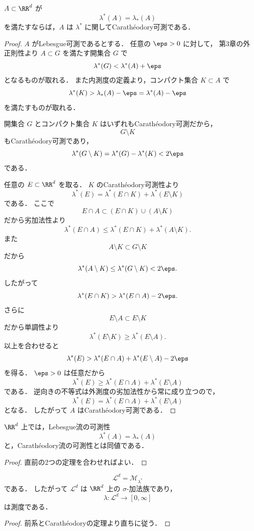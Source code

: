 \begin{theorem}[Lebesgue可測ならCarathéodory可測]
$A \subset \RR^d$ が
\[
\lambda^*(A)=\lambda_*(A)
\]
を満たすならば，$A$ は $\lambda^*$ に関してCarathéodory可測である．
\end{theorem}
\begin{proof}
$A$ がLebesgue可測であるとする．
任意の $\eps>0$ に対して，
第3章の外正則性より $A \subset G$ を満たす開集合 $G$ で
\[
\lambda^*(G)<\lambda^*(A)+\eps
\]
となるものが取れる．
また内測度の定義より，コンパクト集合 $K \subset A$ で
\[
\lambda^*(K)>\lambda_*(A)-\eps=\lambda^*(A)-\eps
\]
を満たすものが取れる．

開集合 $G$ とコンパクト集合 $K$ はいずれもCarathéodory可測だから，
\[
G\setminus K
\]
もCarathéodory可測であり，
\[
\lambda^*(G\setminus K)=\lambda^*(G)-\lambda^*(K)<2\eps
\]
である．

任意の $E \subset \RR^d$ を取る．
$K$ のCarathéodory可測性より
\[
\lambda^*(E)=\lambda^*(E\cap K)+\lambda^*(E\setminus K)
\]
である．
ここで
\[
E\cap A \subset (E\cap K)\cup(A\setminus K)
\]
だから劣加法性より
\[
\lambda^*(E\cap A)\le \lambda^*(E\cap K)+\lambda^*(A\setminus K).
\]
また
\[
A\setminus K \subset G\setminus K
\]
だから
\[
\lambda^*(A\setminus K)\le \lambda^*(G\setminus K)<2\eps.
\]
したがって
\[
\lambda^*(E\cap K)>\lambda^*(E\cap A)-2\eps.
\]
さらに
\[
E\setminus A \subset E\setminus K
\]
だから単調性より
\[
\lambda^*(E\setminus K)\ge \lambda^*(E\setminus A).
\]
以上を合わせると
\[
\lambda^*(E)
>
\lambda^*(E\cap A)+\lambda^*(E\setminus A)-2\eps
\]
を得る．
$\eps>0$ は任意だから
\[
\lambda^*(E)\ge \lambda^*(E\cap A)+\lambda^*(E\setminus A)
\]
である．
逆向きの不等式は外測度の劣加法性から常に成り立つので，
\[
\lambda^*(E)
=
\lambda^*(E\cap A)+\lambda^*(E\setminus A)
\]
となる．
したがって $A$ はCarathéodory可測である．
\end{proof}

\begin{corollary}[2つの定義の一致]
$\RR^d$ 上では，Lebesgue流の可測性
\[
\lambda^*(A)=\lambda_*(A)
\]
と，Carathéodory流の可測性とは同値である．
\end{corollary}
\begin{proof}
直前の2つの定理を合わせればよい．
\end{proof}

\begin{corollary}[第5章の基本定理]
\[
\mathcal L^d
=
\mathcal M_{\lambda^*}
\]
である．
したがって $\mathcal L^d$ は $\RR^d$ 上の $\sigma$-加法族であり，
\[
\lambda:\mathcal L^d\to[0,\infty]
\]
は測度である．
\end{corollary}
\begin{proof}
前系とCarathéodoryの定理より直ちに従う．
\end{proof}

